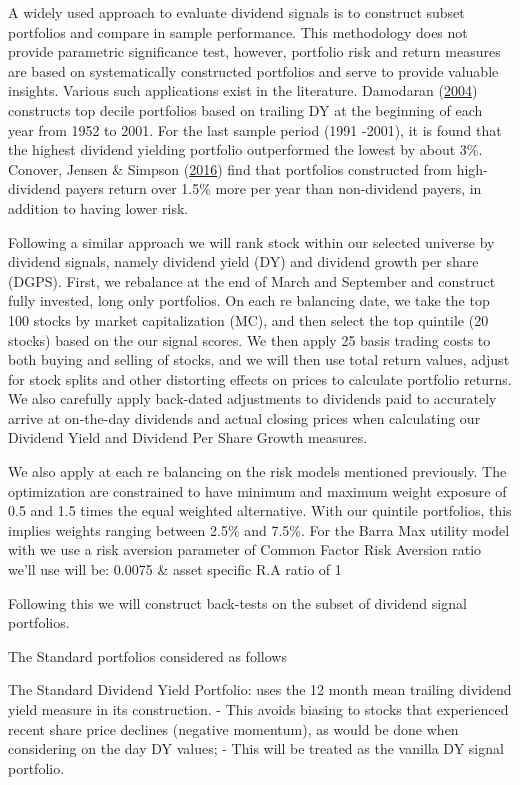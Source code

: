 \documentclass[11pt,preprint, authoryear]{elsarticle}
\numberwithin{equation}{section}
\numberwithin{figure}{section}
\numberwithin{table}{section}
\begin{document}
A widely used approach to evaluate dividend signals is to construct
subset portfolios and compare in sample performance. This methodology
does not provide parametric significance test, however, portfolio risk
and return measures are based on systematically constructed portfolios
and serve to provide valuable insights. Various such applications exist
in the literature. Damodaran
(\protect\hyperlink{ref-damodaran2004investment}{2004}) constructs top
decile portfolios based on trailing DY at the beginning of each year
from 1952 to 2001. For the last sample period (1991 -2001), it is found
that the highest dividend yielding portfolio outperformed the lowest by
about 3\%. Conover, Jensen \& Simpson
(\protect\hyperlink{ref-conover2016difference}{2016}) find that
portfolios constructed from high-dividend payers return over 1.5\% more
per year than non-dividend payers, in addition to having lower risk.

Following a similar approach we will rank stock within our selected
universe by dividend signals, namely dividend yield (DY) and dividend
growth per share (DGPS). First, we rebalance at the end of March and
September and construct fully invested, long only portfolios. On each re
balancing date, we take the top 100 stocks by market capitalization
(MC), and then select the top quintile (20 stocks) based on the our
signal scores. We then apply 25 basis trading costs to both buying and
selling of stocks, and we will then use total return values, adjust for
stock splits and other distorting effects on prices to calculate
portfolio returns. We also carefully apply back-dated adjustments to
dividends paid to accurately arrive at on-the-day dividends and actual
closing prices when calculating our Dividend Yield and Dividend Per
Share Growth measures.

We also apply at each re balancing on the risk models mentioned
previously. The optimization are constrained to have minimum and maximum
weight exposure of 0.5 and 1.5 times the equal weighted alternative.
With our quintile portfolios, this implies weights ranging between 2.5\%
and 7.5\%. For the Barra Max utility model with we use a risk aversion
parameter of Common Factor Risk Aversion ratio we'll use will be: 0.0075
\& asset specific R.A ratio of 1

Following this we will construct back-tests on the subset of dividend
signal portfolios.

The Standard portfolios considered as follows

The Standard Dividend Yield Portfolio: uses the 12 month mean trailing
dividend yield measure in its construction. - This avoids biasing to
stocks that experienced recent share price declines (negative momentum),
as would be done when considering on the day DY values; - This will be
treated as the vanilla DY signal portfolio.
\end{document}
